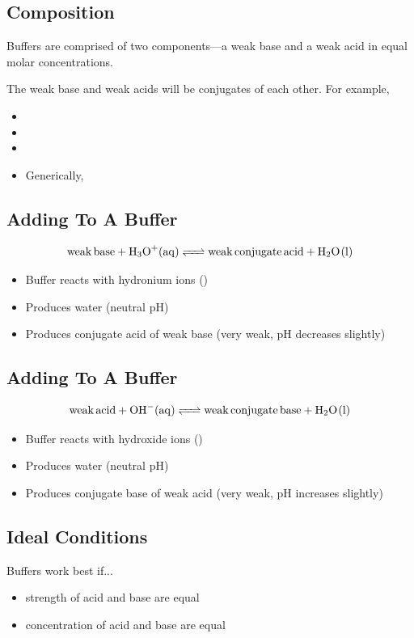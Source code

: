 \documentclass[a4paper,12pt]{article}
\begin{document}
\subsection{Composition}
Buffers are comprised of two components---a weak base and a weak acid in equal molar concentrations.

The weak base and weak acids will be conjugates of each other. For example,
\begin{itemize}
    \item{}
    \item{}
    \item{}
    \item{Generically, }
\end{itemize}

\subsection{Adding  To A Buffer}
$$\ce{weak base + H3O+(aq) <=> weak conjugate acid + H2O(l)}$$
\begin{itemize}
    \item{Buffer reacts with hydronium ions ()}
    \item{Produces water (neutral pH)}
    \item{Produces conjugate acid of weak base (very weak, pH decreases slightly)}
\end{itemize}

\subsection{Adding  To A Buffer}
$$\ce{weak acid + OH-(aq) <=> weak conjugate base + H2O(l)}$$
\begin{itemize}
    \item{Buffer reacts with hydroxide ions ()}
    \item{Produces water (neutral pH)}
    \item{Produces conjugate base of weak acid (very weak, pH increases slightly)}
\end{itemize}

\subsection{Ideal Conditions}
Buffers work best if...
\begin{itemize}
    \item{strength of acid and base are equal}
    \item{concentration of acid and base are equal}
\end{itemize}
\end{document}
